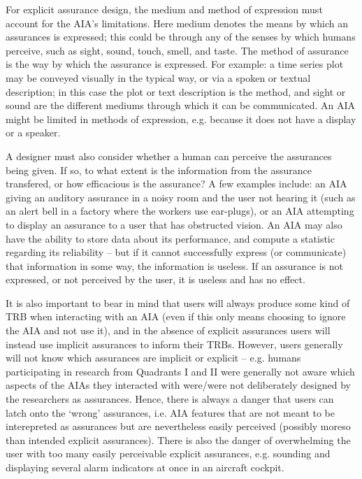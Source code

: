For explicit assurance design, the medium and method of expression must account for the AIA's limitations. 
Here medium denotes the means by which an assurances is expressed; this could be through any of the senses by which humans perceive, such as sight, sound, touch, smell, and taste. The method of assurance is the way by which the assurance is expressed. For example: a time series plot may be conveyed visually in the typical way, or via a spoken or textual description; in this case the plot or text description is the method, and sight or sound are the different mediums through which it can be communicated. An AIA might be limited in methods of expression, e.g. because it does not have a display or a speaker. %

A designer must also consider whether a human can perceive the assurances being given. If so, to what extent is the information from the assurance transfered, or how efficacious is the assurance? A few examples include: an AIA giving an auditory assurance in a noisy room and the user not hearing it (such as an alert bell in a factory where the workers use ear-plugs), or an AIA attempting to display an assurance to a user that has obstructed vision. 
An AIA may also have the ability to store data about its performance, and compute a statistic regarding its reliability -- but if it cannot successfully express (or communicate) that information in some way, the information is useless. 
If an assurance is not expressed, or not perceived by the user, it is useless and has no effect. 

It is also important to bear in mind that users will always produce some kind of TRB when interacting with an AIA (even if this only means choosing to ignore the AIA and not use it), and in the absence of explicit assurances users will instead use implicit assurances to inform their TRBs. 
However, users generally will not know which assurances are implicit or explicit -- e.g. humans participating in research from Quadrants I and II were generally not aware which aspects of the AIAs they interacted with were/were not deliberately designed by the researchers as assurances. 
Hence, there is always a danger that users can latch onto the `wrong' assurances, i.e. AIA features that are not meant to be interepreted as assurances but are nevertheless easily perceived (possibly moreso than intended explicit assurances). There is also the danger of overwhelming the user with too many easily perceivable explicit assurances, e.g. sounding and displaying several alarm indicators at once in an aircraft cockpit. 

